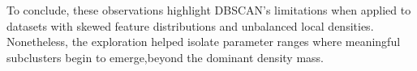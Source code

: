 To conclude, these observations highlight DBSCAN's limitations when applied to datasets with skewed feature distributions and unbalanced local densities.
Nonetheless, the exploration helped isolate parameter ranges where meaningful subclusters begin to emerge,beyond the dominant density mass.












